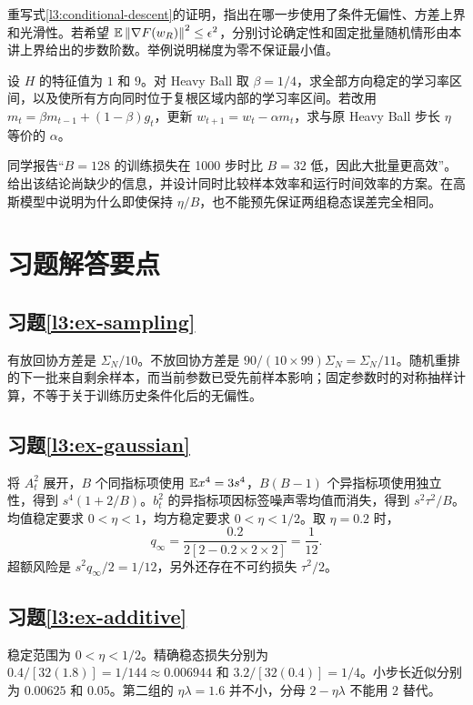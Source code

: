 \begin{exercise}[非凸保证的适用范围]
\label{l3:ex-nonconvex}
重写式\eqref{l3:conditional-descent}的证明，指出在哪一步使用了条件无偏性、方差上界和光滑性。若希望 $\mathbb E\left\lVert\nabla F(w_R)\right\rVert^2\leq\epsilon^2$，分别讨论确定性和固定批量随机情形由本讲上界给出的步数阶数。举例说明梯度为零不保证最小值。
\end{exercise}

\begin{exercise}[动量的参数约定]
\label{l3:ex-momentum}
设 $H$ 的特征值为 $1$ 和 $9$。对 Heavy Ball 取 $\beta=1/4$，求全部方向稳定的学习率区间，以及使所有方向同时位于复根区域内部的学习率区间。若改用 $m_t=\beta m_{t-1}+(1-\beta)g_t$，更新 $w_{t+1}=w_t-\alpha m_t$，求与原 Heavy Ball 步长 $\eta$ 等价的 $\alpha$。
\end{exercise}

\begin{exercise}
\label{l3:ex-batch-design}
同学报告“$B=128$ 的训练损失在 1000 步时比 $B=32$ 低，因此大批量更高效”。给出该结论尚缺少的信息，并设计同时比较样本效率和运行时间效率的方案。在高斯模型中说明为什么即使保持 $\eta/B$，也不能预先保证两组稳态误差完全相同。
\end{exercise}

\section{习题解答要点}
\label{l3:solutions}

\subsection*{习题\ref{l3:ex-sampling}}
有放回协方差是 $\Sigma_N/10$。不放回协方差是
$90/(10\times99)\Sigma_N=\Sigma_N/11$。随机重排的下一批来自剩余样本，而当前参数已受先前样本影响；固定参数时的对称抽样计算，不等于关于训练历史条件化后的无偏性。

\subsection*{习题\ref{l3:ex-gaussian}}
将 $A_t^2$ 展开，$B$ 个同指标项使用 $\mathbb E x^4=3s^4$，$B(B-1)$ 个异指标项使用独立性，得到 $s^4(1+2/B)$。$b_t^2$ 的异指标项因标签噪声零均值而消失，得到 $s^2\tau^2/B$。均值稳定要求 $0<\eta<1$，均方稳定要求 $0<\eta<1/2$。取 $\eta=0.2$ 时，
\[
 q_\infty=\frac{0.2}{2[2-0.2\times2\times2]}=\frac1{12}.
\]
超额风险是 $s^2q_\infty/2=1/12$，另外还存在不可约损失 $\tau^2/2$。

\subsection*{习题\ref{l3:ex-additive}}
稳定范围为 $0<\eta<1/2$。精确稳态损失分别为
$0.4/[32(1.8)]=1/144\approx0.006944$ 和
$3.2/[32(0.4)]=1/4$。小步长近似分别为 $0.00625$ 和 $0.05$。第二组的 $\eta\lambda=1.6$ 并不小，分母 $2-\eta\lambda$ 不能用 $2$ 替代。

